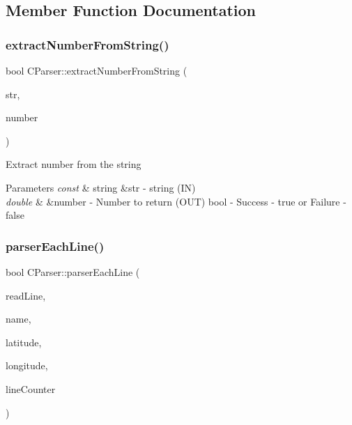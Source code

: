 \subsection{Member Function Documentation}
\mbox{\label{classCParser_a4bd9b28a9d6512c10b2b5af3ff36495f}} 
\subsubsection{\texorpdfstring{extract\+Number\+From\+String()}{extractNumberFromString()}}
{\footnotesize\ttfamily bool C\+Parser\+::extract\+Number\+From\+String (\begin{DoxyParamCaption}\item[{const std\+::string \&}]{str,  }\item[{double \&}]{number }\end{DoxyParamCaption})}

Extract number from the string 
\begin{DoxyParams}{Parameters}
{\em const} & string \&str -\/ string (IN) \\
\hline
{\em double} & \&number -\/ Number to return (O\+UT)  bool -\/ Success -\/ true or Failure -\/ false \\
\hline
\end{DoxyParams}
\mbox{\label{classCParser_a2bfd12df0bb7928de4a0ad50230a2e19}} 
\subsubsection{\texorpdfstring{parser\+Each\+Line()}{parserEachLine()}\hspace{0.1cm}{\footnotesize\ttfamily [1/2]}}
{\footnotesize\ttfamily bool C\+Parser\+::parser\+Each\+Line (\begin{DoxyParamCaption}\item[{const std\+::string \&}]{read\+Line,  }\item[{std\+::string \&}]{name,  }\item[{double \&}]{latitude,  }\item[{double \&}]{longitude,  }\item[{const unsigned int}]{line\+Counter }\end{DoxyParamCaption})}

